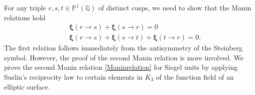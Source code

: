 \documentclass[12pt,amstex,amssymb]{article}
\theoremstyle{plain}
\newcommand{\PP}{\mathbb{P}}
\theoremstyle{definition}
\def\lra{\longrightarrow}
\def\Q{{\mathbb Q}}
\def\BP{{\mathbf{P}}}
\newcommand{\be}{\begin{eqnarray*}}
\newcommand{\ee}{\end{eqnarray*}}
\newcommand{\GL}{\operatorname{GL}}
\newcommand{\Dist}{\operatorname{Dist}}
\begin{document}




For any triple $r,s,t\in \PP^1(\Q)$ of distinct cusps, we need to show that the Manin relations hold
\be
&&{\bm\xi}(r\to s) + {\bm\xi}(s\to r) =0 \\
&&{\bm\xi}(r\to s) + {\bm\xi}(s\to t) + {\bm\xi}(t\to r) = 0.
\ee
The first relation follows immediately from the antisymmetry of the Steinberg symbol. %
However, the proof of the second Manin relation is more involved.
We prove the second Manin relation \eqref{Maninrelation} for Siegel units by applying Suslin's  reciprocity law to certain elements in $K_3$ of the function field of an elliptic surface.
\end{document}
